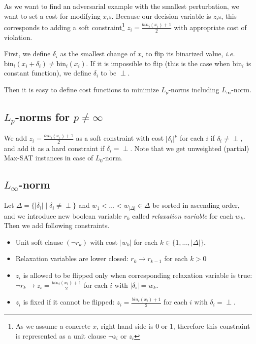 \documentclass[conference]{IEEEtran}
\begin{document}
As we want to find an adversarial example with the smallest perturbation, we want to set a cost for modifying $x_i$s.
Because our decision variable is $z_i$s, this corresponds to adding a soft constraint\footnote{As we assume a concrete $x$, right hand side is $0$ or $1$, therefore this constraint is represented as a unit clause $\neg z_i$ or $z_i$} $z_i = \frac{bin_i(x_i) + 1}{2}$ with appropriate cost of violation.

First, we define $\delta_i$ as the smallest change of $x_i$ to flip its binarized value, \textit{i.e.} $\mathrm{bin}_i (x_i + \delta_i) \neq \mathrm{bin}_i (x_i)$.
If it is impossible to flip (this is the case when $\mathrm{bin}_i$ is constant function), we define $\delta_i$ to be $\perp$.

Then it is easy to define cost functions to minimize $L_p$-norms including $L_\infty$-norm.

\subsection{$L_p$-norms for $p \neq \infty$}

We add $z_i = \frac{bin_i(x_i) + 1}{2}$ as a soft constraint with cost $|\delta_i|^p$ for each $i$ if $\delta_i \neq \perp$, and add it as a hard constraint if $\delta_i = \perp$.
Note that we get unweighted (partial) Max-SAT instances in case of $L_0$-norm.

\subsection{$L_\infty$-norm}

Let $\Delta = \{|\delta_i| \mid \delta_i \neq \perp\}$ and $w_1 < \ldots < w_{|\Delta|} \in \Delta$ be sorted in ascending order, and we introduce new boolean variable $r_k$ called \textit{relaxation variable} for each $w_k$. Then we add following constraints.

\begin{itemize}
    \item Unit soft clause $(\neg r_k)$ with cost $|w_k|$ for each $k \in \{1,\ldots,|\Delta|\}$.
    \item Relaxation variables are lower closed: $r_{k} \to r_{k-1}$ for each $k > 0$
    \item $z_i$ is allowed to be flipped only when corresponding relaxation variable is true: $\neg r_k \to z_i = \frac{bin_i(x_i) + 1}{2}$ for each $i$ with $|\delta_i| = w_k$.
    \item $z_i$ is fixed if it cannot be flipped: $z_i = \frac{bin_i(x_i) + 1}{2}$ for each $i$ with $\delta_i = \perp$.
\end{itemize}
\end{document}
